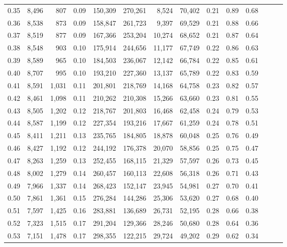 \begin{tabular}{rrrrrrrrrrrrrr}
0.35 &  8,496 &    807 &  0.09 &  150,309 &  270,261 &   8,524 &  70,402 &  0.21 &  0.89 &      0.68 \\
0.36 &  8,538 &    873 &  0.09 &  158,847 &  261,723 &   9,397 &  69,529 &  0.21 &  0.88 &      0.66 \\
0.37 &  8,519 &    877 &  0.09 &  167,366 &  253,204 &  10,274 &  68,652 &  0.21 &  0.87 &      0.64 \\
0.38 &  8,548 &    903 &  0.10 &  175,914 &  244,656 &  11,177 &  67,749 &  0.22 &  0.86 &      0.63 \\
0.39 &  8,589 &    965 &  0.10 &  184,503 &  236,067 &  12,142 &  66,784 &  0.22 &  0.85 &      0.61 \\
0.40 &  8,707 &    995 &  0.10 &  193,210 &  227,360 &  13,137 &  65,789 &  0.22 &  0.83 &      0.59 \\
0.41 &  8,591 &  1,031 &  0.11 &  201,801 &  218,769 &  14,168 &  64,758 &  0.23 &  0.82 &      0.57 \\
0.42 &  8,461 &  1,098 &  0.11 &  210,262 &  210,308 &  15,266 &  63,660 &  0.23 &  0.81 &      0.55 \\
0.43 &  8,505 &  1,202 &  0.12 &  218,767 &  201,803 &  16,468 &  62,458 &  0.24 &  0.79 &      0.53 \\
0.44 &  8,587 &  1,199 &  0.12 &  227,354 &  193,216 &  17,667 &  61,259 &  0.24 &  0.78 &      0.51 \\
0.45 &  8,411 &  1,211 &  0.13 &  235,765 &  184,805 &  18,878 &  60,048 &  0.25 &  0.76 &      0.49 \\
0.46 &  8,427 &  1,192 &  0.12 &  244,192 &  176,378 &  20,070 &  58,856 &  0.25 &  0.75 &      0.47 \\
0.47 &  8,263 &  1,259 &  0.13 &  252,455 &  168,115 &  21,329 &  57,597 &  0.26 &  0.73 &      0.45 \\
0.48 &  8,002 &  1,279 &  0.14 &  260,457 &  160,113 &  22,608 &  56,318 &  0.26 &  0.71 &      0.43 \\
0.49 &  7,966 &  1,337 &  0.14 &  268,423 &  152,147 &  23,945 &  54,981 &  0.27 &  0.70 &      0.41 \\
0.50 &  7,861 &  1,361 &  0.15 &  276,284 &  144,286 &  25,306 &  53,620 &  0.27 &  0.68 &      0.40 \\
0.51 &  7,597 &  1,425 &  0.16 &  283,881 &  136,689 &  26,731 &  52,195 &  0.28 &  0.66 &      0.38 \\
0.52 &  7,323 &  1,515 &  0.17 &  291,204 &  129,366 &  28,246 &  50,680 &  0.28 &  0.64 &      0.36 \\
0.53 &  7,151 &  1,478 &  0.17 &  298,355 &  122,215 &  29,724 &  49,202 &  0.29 &  0.62 &      0.34 \\

\end{tabular}
